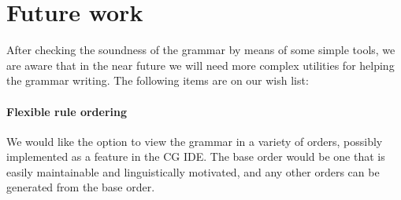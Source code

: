 \documentclass[11pt]{article}
\def\t#1{\texttt{#1}}
\begin{document}




\section{Future work}

After checking the soundness of the grammar by means of some simple
tools, we are aware that in the near future we will need more complex
utilities for helping the grammar writing.
The following items are on our wish list:


\paragraph{Flexible rule ordering} We would like the option to view
the grammar in a variety of orders, possibly implemented as a feature
  in the CG IDE. The base order would be one that is easily
  maintainable and linguistically motivated, and any other orders can
  be generated from the base order.
\end{document}
